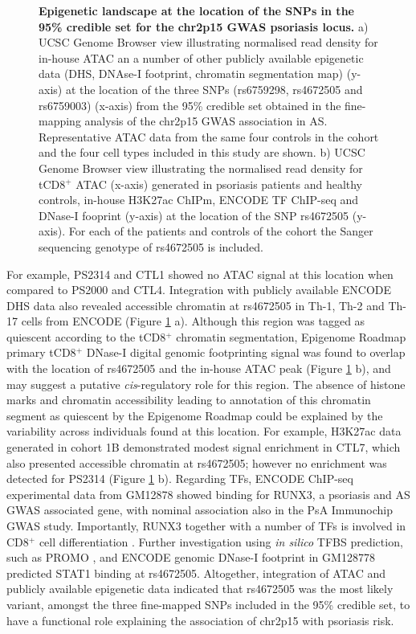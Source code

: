 \begin{figure}[htbp]
\begin{subfigure}[b]{0.45\textwidth}
\caption{\textbf{}}
\end{subfigure}
\caption[Epigenetic landscape at the location of the SNPs in the 95\% credible set for the chr2p15 GWAS psoriasis locus.]{\textbf{Epigenetic landscape at the location of the SNPs in the 95\% credible set for the chr2p15 GWAS psoriasis locus.} a) UCSC Genome Browser view illustrating normalised read density for in-house ATAC an a number of other publicly available epigenetic data (DHS, DNAse-I footprint, chromatin segmentation map) (y-axis) at the location of the three SNPs (rs6759298, rs4672505 and rs6759003) (x-axis) from the 95\% credible set obtained in the fine-mapping analysis of the chr2p15 GWAS association in AS. Representative ATAC data from the same four controls in the cohort and the four cell types included in this study are shown. b) UCSC Genome Browser view illustrating the normalised read density for tCD8$^+$ ATAC (x-axis) generated in psoriasis patients and healthy controls, in-house H3K27ac ChIPm, ENCODE TF ChIP-seq and DNase-I fooprint (y-axis) at the location of the SNP rs4672505 (y-axis). For each of the patients and controls of the cohort the Sanger sequencing genotype of rs4672505 is included.}
\label{figure:ATAC_PS_CTL_chr2p15_rs4672505}
\end{figure} 


For example, PS2314 and CTL1 showed no ATAC signal at this location when compared to PS2000 and CTL4. Integration with publicly available ENCODE DHS data also revealed accessible chromatin at rs4672505 in Th-1, Th-2 and Th-17 cells from ENCODE (Figure \ref{figure:ATAC_PS_CTL_chr2p15_rs4672505} a). Although this region was tagged as quiescent according to the tCD8$^+$ chromatin segmentation, Epigenome Roadmap primary tCD8$^+$ DNase-I digital genomic footprinting signal was found to overlap with the location of rs4672505 and the in-house ATAC peak (Figure \ref{figure:ATAC_PS_CTL_chr2p15_rs4672505} b), and may suggest a putative \textit{cis}-regulatory role for this region. The absence of histone marks and chromatin accessibility leading to annotation of this chromatin segment as quiescent by the Epigenome Roadmap could be explained by the variability across individuals found at this location. For example, H3K27ac data generated in cohort 1B demonstrated modest signal enrichment in CTL7, which also presented accessible chromatin at rs4672505; however no enrichment was detected for PS2314 (Figure \ref{figure:ATAC_PS_CTL_chr2p15_rs4672505} b). Regarding TFs, ENCODE ChIP-seq experimental data from GM12878 showed binding for RUNX3, a psoriasis and AS GWAS associated gene, with nominal association also in the PsA Immunochip GWAS study. Importantly, RUNX3 together with a number of TFs is involved in CD8$^+$ cell differentiation \parencite{Wong2011}. Further investigation using \textit{in silico} TFBS prediction, such as PROMO \parencite{Messeguer2002}, and ENCODE genomic DNase-I footprint in GM128778 predicted STAT1 binding at rs4672505. Altogether, integration of ATAC and publicly available epigenetic data indicated that rs4672505 was the most likely variant, amongst the three fine-mapped SNPs included in the 95\% credible set, to have a functional role explaining the association of chr2p15 with psoriasis risk.


